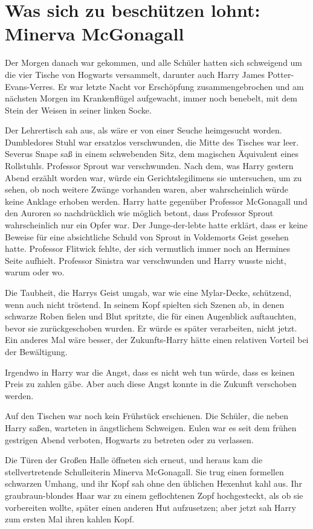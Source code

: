 \chapter{Was sich zu beschützen lohnt: Minerva McGonagall}

Der Morgen danach war gekommen, und alle Schüler hatten sich schweigend um die
vier Tische von Hogwarts versammelt, darunter auch Harry James
Potter-Evans-Verres. Er war letzte Nacht vor Erschöpfung zusammengebrochen und
am nächsten Morgen im Krankenflügel aufgewacht, immer noch benebelt, mit dem
Stein der Weisen in seiner linken Socke.

Der Lehrertisch sah aus, als wäre er von einer Seuche heimgesucht worden.
Dumbledores Stuhl war ersatzlos verschwunden, die Mitte des Tisches war leer.
Severus Snape saß in einem schwebenden Sitz, dem magischen Äquivalent eines
Rollstuhls. Professor Sprout war verschwunden. Nach dem, was Harry gestern Abend
erzählt worden war, würde ein Gerichtslegilimens sie untersuchen, um zu sehen,
ob noch weitere Zwänge vorhanden waren, aber wahrscheinlich würde keine Anklage
erhoben werden. Harry hatte gegenüber Professor McGonagall und den Auroren so
nachdrücklich wie möglich betont, dass Professor Sprout wahrscheinlich nur ein
Opfer war. Der Junge-der-lebte hatte erklärt, dass er keine Beweise für eine
absichtliche Schuld von Sprout in Voldemorts Geist gesehen hatte. Professor
Flitwick fehlte, der sich vermutlich immer noch an Hermines Seite aufhielt.
Professor Sinistra war verschwunden und Harry wusste nicht, warum oder wo.

Die Taubheit, die Harrys Geist umgab, war wie eine Mylar-Decke, schützend, wenn
auch nicht tröstend. In seinem Kopf spielten sich Szenen ab, in denen schwarze
Roben fielen und Blut spritzte, die für einen Augenblick auftauchten, bevor sie
zurückgeschoben wurden. Er würde es später verarbeiten, nicht jetzt. Ein anderes
Mal wäre besser, der Zukunfts-Harry hätte einen relativen Vorteil bei der
Bewältigung.

Irgendwo in Harry war die Angst, dass es nicht weh tun würde, dass es keinen
Preis zu zahlen gäbe. Aber auch diese Angst konnte in die Zukunft verschoben
werden.

Auf den Tischen war noch kein Frühstück erschienen. Die Schüler, die neben Harry
saßen, warteten in ängstlichem Schweigen. Eulen war es seit dem frühen gestrigen
Abend verboten, Hogwarts zu betreten oder zu verlassen.

Die Türen der Großen Halle öffneten sich erneut, und heraus kam die
stellvertretende Schulleiterin Minerva McGonagall. Sie trug einen formellen
schwarzen Umhang, und ihr Kopf sah ohne den üblichen Hexenhut kahl aus. Ihr
graubraun-blondes Haar war zu einem geflochtenen Zopf hochgesteckt, als ob sie
vorbereiten wollte, später einen anderen Hut aufzusetzen; aber jetzt sah Harry
zum ersten Mal ihren kahlen Kopf.

